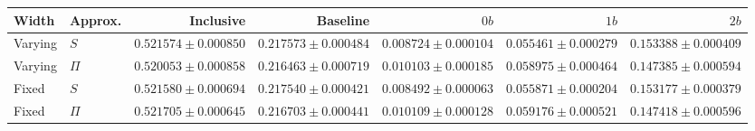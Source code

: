 \begin{tabular}{llrrrrr}
\toprule
Width & Approx. & Inclusive & Baseline & $0b$ & $1b$ & $2b$ \\
\midrule
Varying & $S$ & $0.521574\pm0.000850$ & $0.217573\pm0.000484$ & $0.008724\pm0.000104$ & $0.055461\pm0.000279$ & $0.153388\pm0.000409$ \\
Varying & $\Pi$ & $0.520053\pm0.000858$ & $0.216463\pm0.000719$ & $0.010103\pm0.000185$ & $0.058975\pm0.000464$ & $0.147385\pm0.000594$ \\
Fixed & $S$ & $0.521580\pm0.000694$ & $0.217540\pm0.000421$ & $0.008492\pm0.000063$ & $0.055871\pm0.000204$ & $0.153177\pm0.000379$ \\
Fixed & $\Pi$ & $0.521705\pm0.000645$ & $0.216703\pm0.000441$ & $0.010109\pm0.000128$ & $0.059176\pm0.000521$ & $0.147418\pm0.000596$ \\
\bottomrule
\end{tabular}
